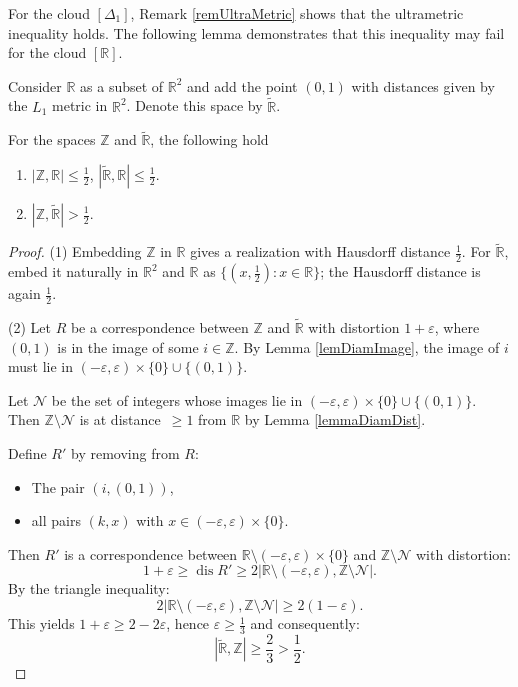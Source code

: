 \documentclass[leqno]{article}
\begin{document}
For the cloud $[\Delta_{1}]$, Remark \ref{remUltraMetric} shows that the ultrametric inequality holds. The following lemma demonstrates that this inequality may fail for the cloud $[\mathbb{R}]$.

Consider $\mathbb{R}$ as a subset of $\mathbb{R}^2$ and add the point $(0,1)$ with distances given by the $L_1$ metric in $\mathbb{R}^2$. Denote this space by $\widetilde{\mathbb{R}}$.

\begin{theorem}\label{thrmRUltraMetric}
For the spaces $\mathbb{Z}$ and $\widetilde{\mathbb{R}}$, the following hold\/\rom{:}
\begin{enumerate}
  \item $|\mathbb{Z}, \mathbb{R}| \le \frac{1}{2}$, $|\widetilde{\mathbb{R}}, \mathbb{R}| \le \frac{1}{2}$.\label{thrmPt:1}
  \item $|\mathbb{Z}, \widetilde{\mathbb{R}}|>  \frac{1}{2}$.\label{thrmPt:2}
\end{enumerate}
\end{theorem}

\begin{proof}
(1) Embedding $\mathbb{Z}$ in $\mathbb{R}$ gives a realization with Hausdorff distance $\frac{1}{2}$. For $\widetilde{\mathbb{R}}$, embed it naturally in $\mathbb{R}^2$ and $\mathbb{R}$ as $\{(x, \frac{1}{2}) : x \in \mathbb{R}\}$; the Hausdorff distance is again $\frac{1}{2}$.

(2) Let $R$ be a correspondence between $\mathbb{Z}$ and $\widetilde{\mathbb{R}}$ with distortion $1 + \varepsilon$, where $(0,1)$ is in the image of some $i \in \mathbb{Z}$. By Lemma \ref{lemDiamImage}, the image of $i$ must lie in $(-\varepsilon, \varepsilon) \times \{0\} \cup \{(0,1)\}$. 

Let $\mathcal{N}$ be the set of integers whose images lie in $(-\varepsilon, \varepsilon) \times \{0\} \cup \{(0,1)\}$. Then $\mathbb{Z} \setminus \mathcal{N}$ is at \mbox{distance $\geq 1$} from $\mathbb{R}$ by Lemma \ref{lemmaDiamDist}.

Define $R'$ by removing from $R$:
\begin{itemize}
    \item The pair $(i,(0,1))$,
    \item all pairs $(k,x)$ with $x \in (-\varepsilon, \varepsilon) \times \{0\}$.
\end{itemize}

Then $R'$ is a correspondence between $\mathbb{R}\setminus(-\varepsilon, \varepsilon) \times \{0\}$ and $\mathbb{Z} \setminus \mathcal{N}$ with distortion:
$$
1+\varepsilon \geq \operatorname{dis} R' \geq 2\big|\mathbb{R}\setminus(-\varepsilon, \varepsilon), \mathbb{Z} \setminus \mathcal{N}\big|.
$$
By the triangle inequality:
$$
2\big|\mathbb{R}\setminus(-\varepsilon, \varepsilon), \mathbb{Z} \setminus \mathcal{N}\big| \geq 2(1 - \varepsilon).
$$
This yields $1+\varepsilon \geq 2-2\varepsilon$, hence $\varepsilon \geq \frac{1}{3}$ and consequently:
$$
|\widetilde{\mathbb{R}}, \mathbb{Z}| \geq \frac{2}{3} > \frac{1}{2}.
$$
\end{proof}
\end{document}
